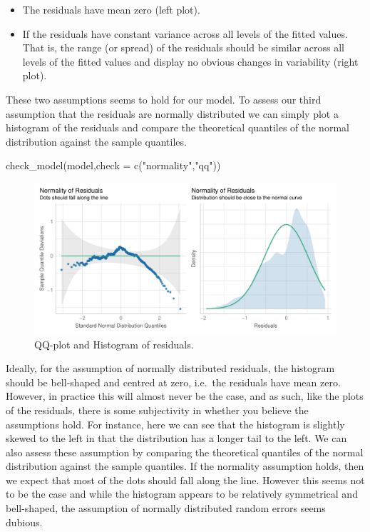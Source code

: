 \documentclass[
  letterpaper,
  DIV=11,
  numbers=noendperiod]{scrartcl}
\newenvironment{Shaded}{\begin{snugshade}}{\end{snugshade}}
\newcommand{\AttributeTok}[1]{\textcolor[rgb]{0.40,0.45,0.13}{#1}}
\newcommand{\FunctionTok}[1]{\textcolor[rgb]{0.28,0.35,0.67}{#1}}
\newcommand{\NormalTok}[1]{\textcolor[rgb]{0.00,0.23,0.31}{#1}}
\newcommand{\StringTok}[1]{\textcolor[rgb]{0.13,0.47,0.30}{#1}}
\providecommand{\tightlist}{%
  \setlength{\itemsep}{0pt}\setlength{\parskip}{0pt}}\usepackage{longtable,booktabs,array}
\begin{document}
\begin{itemize}
\tightlist
\item
  The residuals have mean zero (left plot).
\item
  If the residuals have constant variance across all levels of the
  fitted values. That is, the range (or spread) of the residuals should
  be similar across all levels of the fitted values and display no
  obvious changes in variability (right plot).
\end{itemize}

These two assumptions seems to hold for our model. To assess our third
assumption that the residuals are normally distributed we can simply
plot a histogram of the residuals and compare the theoretical quantiles
of the normal distribution against the sample quantiles.

\begin{Shaded}
\begin{Highlighting}[]
\FunctionTok{check\_model}\NormalTok{(model,}\AttributeTok{check =} \FunctionTok{c}\NormalTok{(}\StringTok{"normality"}\NormalTok{,}\StringTok{"qq"}\NormalTok{))}
\end{Highlighting}
\end{Shaded}

\begin{figure}[H]

{\centering \includegraphics{index_files/figure-pdf/lm9-1.pdf}

}

\caption{QQ-plot and Histogram of residuals.}

\end{figure}%

Ideally, for the assumption of normally distributed residuals, the
histogram should be bell-shaped and centred at zero, i.e.~the residuals
have mean zero. However, in practice this will almost never be the case,
and as such, like the plots of the residuals, there is some subjectivity
in whether you believe the assumptions hold. For instance, here we can
see that the histogram is slightly skewed to the left in that the
distribution has a longer tail to the left. We can also assess these
assumption by comparing the theoretical quantiles of the normal
distribution against the sample quantiles. If the normality assumption
holds, then we expect that most of the dots should fall along the line.
However this seems not to be the case and while the histogram appears to
be relatively symmetrical and bell-shaped, the assumption of normally
distributed random errors seems dubious.
\end{document}
